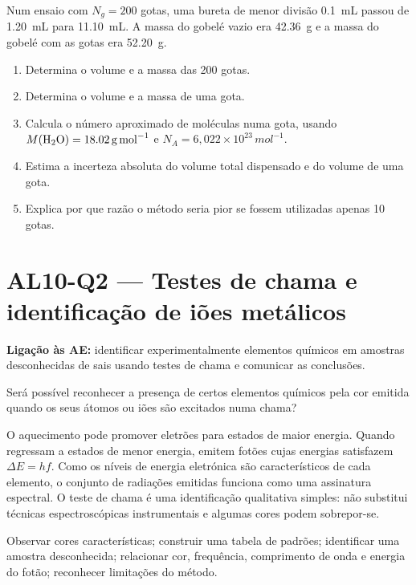 \documentclass[11pt,a4paper,openany]{book}
\newcounter{exercicio}[chapter]
\renewcommand{\theexercicio}{\thechapter.\arabic{exercicio}}
\newenvironment{exercicio}[1][]%
{\refstepcounter{exercicio}%
\begin{tcolorbox}[breakable,colback=white,colframe=eublue!70,
 title={Exercício \theexercicio\if\relax\detokenize{#1}\relax\else\ --- #1\fi},fonttitle=\bfseries]}%
{\end{tcolorbox}}
\newcommand{\LigAE}[1]{\textbf{Ligação às AE:} #1}
\begin{document}
\begin{exercicio}[Uma gota em números]
Num ensaio com $N_g=200$ gotas, uma bureta de menor divisão \SI{0.1}{mL} passou de \SI{1.20}{mL} para \SI{11.10}{mL}. A massa do gobelé vazio era \SI{42.36}{g} e a massa do gobelé com as gotas era \SI{52.20}{g}.
\begin{enumerate}[label=\alph*)]
\item Determina o volume e a massa das 200 gotas.
\item Determina o volume e a massa de uma gota.
\item Calcula o número aproximado de moléculas numa gota, usando $M(\ce{H2O})=\SI{18.02}{g.mol^{-1}}$ e $N_A=6,022\times10^{23}\,\si{mol^{-1}}$.
\item Estima a incerteza absoluta do volume total dispensado e do volume de uma gota.
\item Explica por que razão o método seria pior se fossem utilizadas apenas 10 gotas.
\end{enumerate}
\end{exercicio}

\section{AL10-Q2 — Testes de chama e identificação de iões metálicos}
\LigAE{identificar experimentalmente elementos químicos em amostras desconhecidas de sais usando testes de chama e comunicar as conclusões.}

\begin{questao}
Será possível reconhecer a presença de certos elementos químicos pela cor emitida quando os seus átomos ou iões são excitados numa chama?
\end{questao}

\begin{fundamento}
O aquecimento pode promover eletrões para estados de maior energia. Quando regressam a estados de menor energia, emitem fotões cujas energias satisfazem $\Delta E=hf$. Como os níveis de energia eletrónica são característicos de cada elemento, o conjunto de radiações emitidas funciona como uma assinatura espectral. O teste de chama é uma identificação qualitativa simples: não substitui técnicas espectroscópicas instrumentais e algumas cores podem sobrepor-se.
\end{fundamento}

\begin{objetivos}
Observar cores características; construir uma tabela de padrões; identificar uma amostra desconhecida; relacionar cor, frequência, comprimento de onda e energia do fotão; reconhecer limitações do método.
\end{objetivos}
\end{document}
